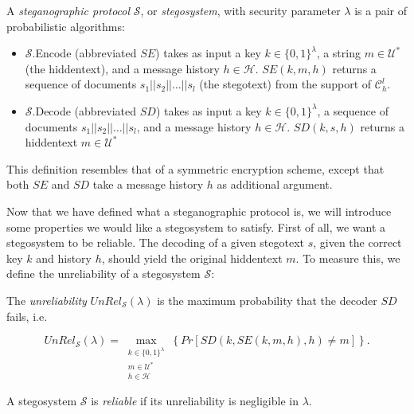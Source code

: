 \begin{definition}
\label{def:stegosystem}
A \emph{steganographic protocol} $\mathcal{S}$, or \emph{stegosystem}, with security parameter $\lambda$ is a pair of probabilistic algorithms:

\begin{itemize}
  \item $\mathcal{S}$.Encode (abbreviated $SE$) takes as input a key $k \in \{0,1\}^\lambda$, a string $m \in \mathcal{U}^*$ (the hiddentext), and a message history $h \in \mathcal{H}$.
    $SE(k, m, h)$ returns a sequence of documents $s_1||s_2||\dots||s_l$ (the stegotext) from the support of $\mathcal{C}_h^l$.
  \item $\mathcal{S}$.Decode (abbreviated $SD$) takes as input a key $k \in \{0,1\}^\lambda$, a sequence of documents $s_1||s_2||\dots||s_l$, and a message history $h \in \mathcal{H}$.
    $SD(k, s, h)$ returns a hiddentext $m \in \mathcal{U}^*$
\end{itemize}
\end{definition}

This definition resembles that of a symmetric encryption scheme, except that both $SE$ and $SD$ take a message history $h$ as additional argument.

Now that we have defined what a steganographic protocol is, we will introduce some properties we would like a stegosystem to satisfy.
First of all, we want a stegosystem to be reliable.
The decoding of a given stegotext $s$, given the correct key $k$ and history $h$, should yield the original hiddentext $m$.
To measure this, we define the unreliability of a stegosystem $\mathcal{S}$:

\begin{definition}
\label{def:unreliability}
The \emph{unreliability} $UnRel_{\mathcal{S}}(\lambda)$ is the maximum probability that the decoder $SD$ fails, i.e.	

$$UnRel_{\mathcal{S}}(\lambda) = \max_{\substack{k \in \{0,1\}^\lambda\\m \in \mathcal{U}^*\\ h \in \mathcal{H}}}\left\{ Pr[SD(k, SE(k,m,h), h) \neq m] \right\}.$$
\end{definition}


\begin{definition}[Reliability]
\label{def:reliability}
A stegosystem $\mathcal{S}$ is \emph{reliable} if its unreliability is negligible in $\lambda$.
\end{definition}

